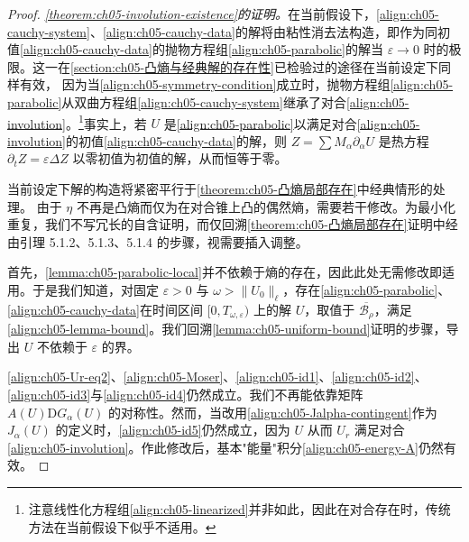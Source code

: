 \documentclass[../../main.tex]{subfiles}
\begin{document}
\begin{proof}
\emph{\cref{theorem:ch05-involution-existence}的证明。}在当前假设下，\eqref{align:ch05-cauchy-system}、\eqref{align:ch05-cauchy-data}的解将由粘性消去法构造，即作为同初值\eqref{align:ch05-cauchy-data}的抛物方程组\eqref{align:ch05-parabolic}的解当 $\varepsilon\to0$ 时的极限。这一在\cref{section:ch05-凸熵与经典解的存在性}已检验过的途径在当前设定下同样有效，
因为当\eqref{align:ch05-symmetry-condition}成立时，抛物方程组\eqref{align:ch05-parabolic}从双曲方程组\eqref{align:ch05-cauchy-system}继承了对合\eqref{align:ch05-involution}。\footnote{注意线性化方程组\eqref{align:ch05-linearized}并非如此，因此在对合存在时，传统方法在当前假设下似乎不适用。}事实上，若 $U$ 是\eqref{align:ch05-parabolic}以满足对合\eqref{align:ch05-involution}的初值\eqref{align:ch05-cauchy-data}的解，则 $Z=\sum M_{\alpha}\partial_{\alpha}U$ 是热方程 $\partial_{t}Z=\varepsilon\Delta Z$ 以零初值为初值的解，从而恒等于零。

当前设定下解的构造将紧密平行于\cref{theorem:ch05-凸熵局部存在}中经典情形的处理。
由于 $\eta$ 不再是凸熵而仅为在对合锥上凸的偶然熵，需要若干修改。为最小化重复，我们不写冗长的自含证明，而仅回溯\cref{theorem:ch05-凸熵局部存在}证明中经由引理 5.1.2、5.1.3、5.1.4 的步骤，视需要插入调整。

首先，\cref{lemma:ch05-parabolic-local}并不依赖于熵的存在，因此此处无需修改即适用。于是我们知道，对固定 $\varepsilon>0$ 与 $\omega>\|U_{0}\|_{\ell}$，存在\eqref{align:ch05-parabolic}、\eqref{align:ch05-cauchy-data}在时间区间 $[0,T_{\omega,\varepsilon})$ 上的解 $U$，取值于 $\overline{\mathscr{B}_{\rho}}$，满足\eqref{align:ch05-lemma-bound}。我们回溯\cref{lemma:ch05-uniform-bound}证明的步骤，导出 $U$ 不依赖于 $\varepsilon$ 的界。

\eqref{align:ch05-Ur-eq2}、\eqref{align:ch05-Moser}、\eqref{align:ch05-id1}、\eqref{align:ch05-id2}、\eqref{align:ch05-id3}与\eqref{align:ch05-id4}仍然成立。我们不再能依靠矩阵 $A(U)\mathrm{D}G_{\alpha}(U)$ 的对称性。然而，当改用\eqref{align:ch05-Jalpha-contingent}作为 $J_{\alpha}(U)$ 的定义时，\eqref{align:ch05-id5}仍然成立，因为 $U$ 从而 $U_{r}$ 满足对合\eqref{align:ch05-involution}。作此修改后，基本"能量"积分\eqref{align:ch05-energy-A}仍然有效。


\end{proof}
\end{document}
